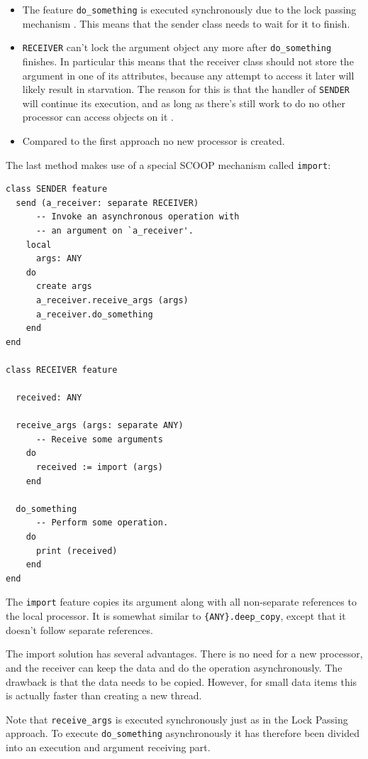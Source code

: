 \documentclass[a4paper,10pt]{article}
\begin{document}
\begin{itemize}
 \item The feature \lstinline!do_something! is executed synchronously due to the lock passing mechanism \cite[p. 152]{Nienaltowski07}\cite{web:scoop}.
 This means that the sender class needs to wait for it to finish.
 \item \lstinline!RECEIVER! can't lock the argument object any more after \lstinline!do_something! finishes.
 In particular this means that the receiver class should not store the argument in one of its attributes, because any attempt to access it later will likely result in starvation.
 The reason for this is that the handler of \lstinline!SENDER! will continue its execution, and as long as there's still work to do no other processor can access objects on it .
 \item Compared to the first approach no new processor is created.
\end{itemize}

The last method makes use of a special SCOOP mechanism called \lstinline!import!:
\begin{lstlisting}[language=OOSC2Eiffel, captionpos=b, caption={Migrate objects with import.}]
class SENDER feature
  send (a_receiver: separate RECEIVER)
      -- Invoke an asynchronous operation with
      -- an argument on `a_receiver'.
    local
      args: ANY
    do
      create args
      a_receiver.receive_args (args)
      a_receiver.do_something
    end
end

class RECEIVER feature
  
  received: ANY
  
  receive_args (args: separate ANY)
      -- Receive some arguments
    do
      received := import (args)
    end

  do_something
      -- Perform some operation.
    do
      print (received)
    end
end
\end{lstlisting}
The \lstinline!import! feature copies its argument along with all non-separate references to the local processor.
It is somewhat similar to \lstinline!{ANY}.deep_copy!, except that it doesn't follow separate references.

The import solution has several advantages.
There is no need for a new processor, and the receiver can keep the data and do the operation asynchronously.
The drawback is that the data needs to be copied.
However, for small data items this is actually faster than creating a new thread.

Note that \lstinline!receive_args! is executed synchronously just as in the Lock Passing approach.
To execute \lstinline!do_something! asynchronously it has therefore been divided into an execution and argument receiving part.
\end{document}
